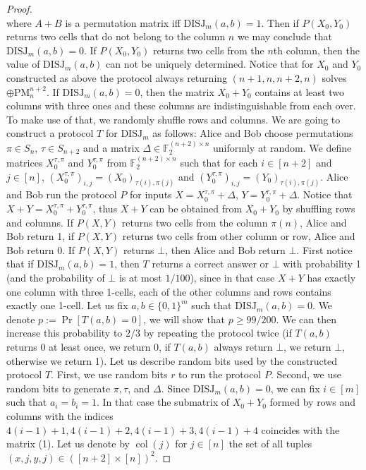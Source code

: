 \begin{proof}
\[\]
where $A+B$ is a permutation matrix iff $\mathrm{DISJ}_m(a,b)=1$. Then if $P(X_0,Y_0)$ returns two cells that do not belong to the column $n$ we may conclude that $\mathrm{DISJ}_m(a,b)=0$. If $P(X_0,Y_0)$ returns two cells from the $n$th column, then the value of $\mathrm{DISJ}_m(a,b)$ can not be uniquely determined. Notice that for $X_0$ and $Y_0$ constructed as above the protocol always returning $(n+1,n,n+2,n)$ solves $\oplus\mathrm{PM}_n^{n+2}$.
If $\mathrm{DISJ}_m(a,b)=0$, then the matrix $X_0+Y_0$ contains at least two columns with three ones and these columns are indistinguishable from each over. To make use of that, we randomly shuffle rows and columns.
We are going to construct a protocol $T$ for $\mathrm{DISJ}_m$ as follows: Alice and Bob choose permutations $\pi\in S_n$, $\tau\in S_{n+2}$ and a matrix $\Delta\in\mathbb F_2^{(n+2)\times n}$ uniformly at random. We define matrices $X_0^{\tau,\pi}$ and $Y_0^{\tau,\pi}$ from $\mathbb F_2^{(n+2)\times n}$ such that for each $i\in[n+2]$ and $j\in[n]$, $(X_0^{\tau,\pi})_{i,j}=(X_0)_{\tau(i),\pi(j)}$ and $(Y_0^{\tau,\pi})_{i,j}=(Y_0)_{\tau(i),\pi(j)}$. Alice and Bob run the protocol $P$ for inputs $X=X_0^{\tau,\pi}+\Delta$, $Y=Y_0^{\tau,\pi}+\Delta$. Notice that $X+Y=X_0^{\tau,\pi}+Y_0^{\tau,\pi}$, thus $X+Y$ can be obtained from $X_0+Y_0$ by shuffling rows and columns. If $P(X,Y)$ returns two cells from the column $\pi(n)$, Alice and Bob return 1, if $P(X,Y)$ returns two cells from other column or row, Alice and Bob return 0. If $P(X,Y)$ returns $\bot$, then Alice and Bob return $\bot$.
First notice that if $\mathrm{DISJ}_m(a,b)=1$, then $T$ returns a correct answer or $\bot$ with probability 1 (and the probability of $\bot$ is at most $1/100$), since in that case $X+Y$ has exactly one column with three 1-cells, each of the other columns and rows contains exactly one 1-cell. Let us fix $a,b\in\{0,1\}^m$ such that $\mathrm{DISJ}_m(a,b)=0$. We denote $p:=\Pr[T(a,b)=0]$, we will show that $p\ge99/200$. We can then increase this probability to $2/3$ by repeating the protocol twice (if $T(a,b)$ returns 0 at least once, we return 0, if $T(a,b)$ always return $\bot$, we return $\bot$, otherwise we return 1).
Let us describe random bits used by the constructed protocol $T$. First, we use random bits $r$ to run the protocol $P$. Second, we use random bits to generate $\pi,\tau$, and $\Delta$. Since $\mathrm{DISJ}_m(a,b)=0$, we can fix $i\in[m]$ such that $a_i=b_i=1$. In that case the submatrix of $X_0+Y_0$ formed by rows and columns with the indices $4(i-1)+1,4(i-1)+2,4(i-1)+3,4(i-1)+4$ coincides with the matrix (1). Let us denote by $\operatorname{col}(j)$ for $j\in[n]$ the set of all tuples $(x,j,y,j)\in([n+2]\times[n])^2$.

\end{proof}

